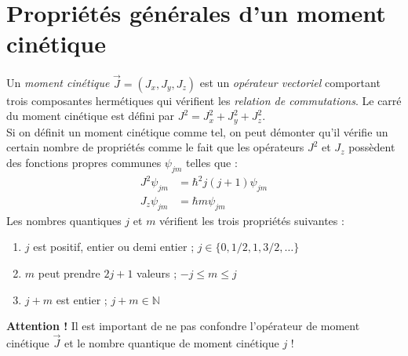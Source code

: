 \documentclass	[11pt, a4paper, openany]{book}
\begin{document}
	
	\section{Propriétés générales d'un moment cinétique}
	Un \textit{moment cinétique} $\vec{J} = (J_x,J_y,J_z)$ est un \textit{opérateur 
	vectoriel} comportant trois composantes hermétiques qui vérifient les \textit{ 
	relation de commutations}. Le carré du moment cinétique est défini par $J^2 = 
	J_x^2 + J_y^2 + J_z^2$. \\
	Si on définit un moment cinétique comme tel, on peut démonter qu'il vérifie un 
	certain nombre de propriétés comme le fait que les opérateurs $J^2$ et $J_z$
	possèdent des fonctions propres communes $\psi_{jm}$ telles que :
	\begin{equation}
	\begin{array}{ll}
	J^2\psi_{jm} &= \hbar^2 j(j+1)\psi_{jm}\\
	J_z\psi_{jm} &= \hbar m \psi_{jm}
	\end{array}
	\end{equation}
	Les nombres quantiques $j$ et $m$ vérifient les trois propriétés suivantes :
	\begin{enumerate}
	\item $j$ est positif, entier ou demi entier ; $j \in \{0,1/2,1,3/2,\dots \}$
	\item $m$ peut prendre $2j+1$ valeurs ; $-j\leq m \leq j$
	\item $j+m$ est entier ; $j+m \in \mathbb{N}$
	\end{enumerate}
	\textbf{Attention !} Il est important de ne pas confondre l'opérateur de 
	moment cinétique $\vec{J}$ et le nombre quantique de moment cinétique $j$ !
	
\end{document}
